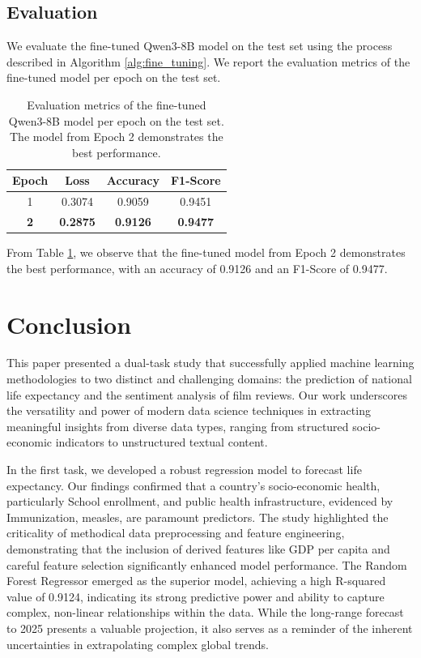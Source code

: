 \documentclass{article}
\begin{document}
\subsection{Evaluation}
\label{ssec:evaluation}

We evaluate the fine-tuned Qwen3-8B model on the test set using the process described in 
Algorithm \ref{alg:fine_tuning}.
We report the evaluation metrics of the fine-tuned model per epoch on the test set.

\begin{table}[H]
\centering
\caption{Evaluation metrics of the fine-tuned Qwen3-8B model per epoch on the test set. The model from Epoch 2 demonstrates the best performance.}
\label{tbl:eval_results}
\begin{tabular}{@{}cccc@{}}
\toprule
\textbf{Epoch} & \textbf{Loss} & \textbf{Accuracy} & \textbf{F1-Score} \\ \midrule
1 & 0.3074& 0.9059 & 0.9451 \\
\textbf{2} & \textbf{0.2875} & \textbf{0.9126} & \textbf{0.9477} \\
\end{tabular}
\end{table}

From Table \ref{tbl:eval_results}, we observe that the fine-tuned model from Epoch 2 demonstrates the best 
performance, with an accuracy of 0.9126 and an F1-Score of 0.9477.


\section{Conclusion}
\label{sec:conclusion}

This paper presented a dual-task study that successfully applied machine learning methodologies to two 
distinct and challenging domains: the prediction of national life expectancy and the sentiment analysis 
of film reviews. Our work underscores the versatility and power of modern data science techniques in 
extracting meaningful insights from diverse data types, ranging from structured socio-economic indicators 
to unstructured textual content.

In the first task, we developed a robust regression model to forecast life expectancy. Our findings 
confirmed that a country's socio-economic health, particularly School enrollment, and public health 
infrastructure, evidenced by Immunization, measles, are paramount predictors. The study highlighted the
 criticality of methodical data preprocessing and feature engineering, demonstrating that the inclusion 
 of derived features like GDP per capita and careful feature selection significantly enhanced model performance. 
 The Random Forest Regressor emerged as the superior model, achieving a high R-squared value of 0.9124, 
 indicating its strong predictive power and ability to capture complex, non-linear relationships within 
 the data. While the long-range forecast to 2025 presents a valuable projection, it also serves as a 
 reminder of the inherent uncertainties in extrapolating complex global trends.
\end{document}
